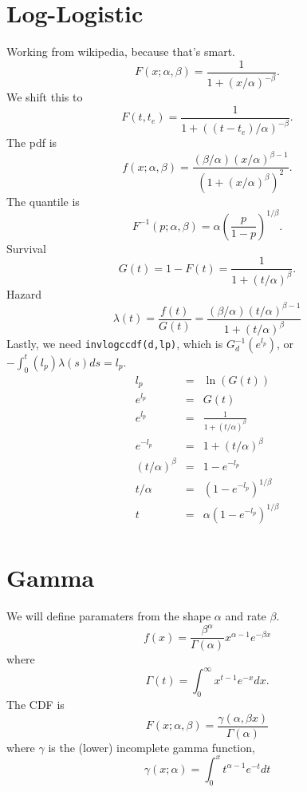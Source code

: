 \documentclass{article}
\newcommand{\code}[1]{\texttt{#1}}
\begin{document}
\section{Log-Logistic}
Working from wikipedia, because that's smart.
\begin{equation}
  F(x;\alpha, \beta)=\frac{1}{1+(x/\alpha)^{-\beta}}.
\end{equation}
We shift this to
\begin{equation}
  F(t, t_e)=\frac{1}{1+((t-t_e)/\alpha)^{-\beta}}.
\end{equation}
The pdf is
\begin{equation}
  f(x;\alpha, \beta)=\frac{(\beta/\alpha)(x/\alpha)^{\beta-1}}
  {(1+(x/\alpha)^\beta)^2}.
\end{equation}
The quantile is
\begin{equation}
  F^{-1}(p; \alpha, \beta)=\alpha \left(\frac{p}{1-p}\right)^{1/\beta}.
\end{equation}
Survival
\begin{equation}
  G(t)=1-F(t)=\frac{1}{1+(t/\alpha)^\beta}.
\end{equation}
Hazard
\begin{equation}
  \lambda(t)=\frac{f(t)}{G(t)}=\frac{(\beta/\alpha)(t/\alpha)^{\beta-1}}
  {1+(t/\alpha)^\beta}
\end{equation}
Lastly, we need \code{invlogccdf(d,lp)}, which is $G_d^{-1}(e^{l_p})$,
or $-\int_0^t(l_p)\lambda(s)ds=l_p$.
\begin{eqnarray}
  l_p&=&\ln(G(t)) \\
  e^{l_p}&=&G(t) \\
  e^{l_p}&=&\frac{1}{1+(t/\alpha)^\beta} \\
  e^{-l_p}&=&1+(t/\alpha)^\beta \\
  (t/\alpha)^\beta&=&  1-e^{-l_p}\\
  t/\alpha&=& (1-e^{-l_p})^{1/\beta}\\
   t&=&\alpha(1-e^{-l_p})^{1/\beta}\\
\end{eqnarray}

\section{Gamma}
We will define paramaters from the shape $\alpha$ and rate $\beta$.
\begin{equation}
  f(x)=\frac{\beta^\alpha}{\Gamma(\alpha)}x^{\alpha-1}e^{-\beta x}
\end{equation}
where
\begin{equation}
  \Gamma(t)=\int_0^\infty x^{t-1}e^{-x}dx.
\end{equation}
The CDF is
\begin{equation}
  F(x;\alpha,\beta)=\frac{\gamma(\alpha,\beta x)}{\Gamma(\alpha)}
\end{equation}
where $\gamma$ is the (lower) incomplete gamma function,
\begin{equation}
  \gamma(x;\alpha)=\int_0^x t^{\alpha-1}e^{-t}dt
\end{equation}
\end{document}
